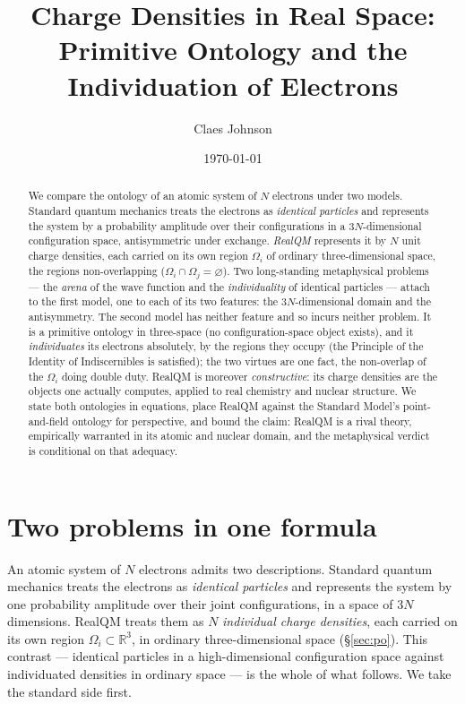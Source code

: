 \documentclass[11pt]{article}
\title{Charge Densities in Real Space:\\
Primitive Ontology and the Individuation of Electrons}
\author[1]{Claes Johnson}
\affil[1]{KTH Royal Institute of Technology, SE-100 44 Stockholm, Sweden \\
\texttt{claesjohnson@gmail.com}}
\date{\today}
\begin{document}
\maketitle

\begin{abstract}
We compare the ontology of an atomic system of $N$ electrons under two models. Standard quantum
mechanics treats the electrons as \emph{identical particles} and represents the system by a probability
amplitude over their configurations in a $3N$-dimensional configuration space, antisymmetric under
exchange. \emph{RealQM} represents
it by $N$ unit charge densities, each carried on its own region $\Omega_i$ of ordinary three-dimensional
space, the regions non-overlapping ($\Omega_i\cap\Omega_j=\varnothing$). Two long-standing
metaphysical problems --- the \emph{arena} of the wave function and the \emph{individuality} of identical
particles --- attach to the first model, one to each of its two features: the $3N$-dimensional domain and
the antisymmetry. The second model has neither feature and so incurs neither problem. It is a primitive
ontology in three-space (no configuration-space object exists), and it \emph{individuates} its electrons
absolutely, by the regions they occupy (the Principle of the Identity of Indiscernibles is satisfied); the
two virtues are one fact, the non-overlap of the $\Omega_i$ doing double duty. RealQM is
moreover \emph{constructive}: its charge densities are the objects one actually computes, applied to real
chemistry and nuclear structure. We state both ontologies in equations, place RealQM against the Standard
Model's point-and-field ontology for perspective, and bound the claim: RealQM is a rival theory,
empirically warranted in its atomic and nuclear domain, and the metaphysical verdict is conditional on
that adequacy.
\end{abstract}


\section{Two problems in one formula}
\label{sec:two}

An atomic system of $N$ electrons admits two descriptions. Standard quantum mechanics treats the electrons
as \emph{identical particles} and represents the system by one probability amplitude over their joint
configurations, in a space of $3N$ dimensions. RealQM treats them as $N$ \emph{individual charge
densities}, each carried on its own region $\Omega_i\subset\mathbb R^3$, in ordinary three-dimensional
space (\S\ref{sec:po}). This contrast --- identical particles in a high-dimensional configuration space
against individuated densities in ordinary space --- is the whole of what follows. We take the standard
side first.
\end{document}
